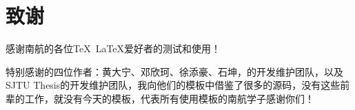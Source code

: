\chapter{致谢}

感谢南航的各位\TeX~\LaTeX 爱好者的测试和使用！

特别感谢\oldnuaathesis 的四位作者：黄大宁、邓欣珂、徐添豪、石坤，\seuthesix 的开发维护团队，以及SJTU Thesis的开发维护团队，我向他们的模板中借鉴了很多的源码，没有这些前辈的工作，就没有今天的\nuaathesis 模板，代表所有使用\nuaathesis 模板的南航学子感谢你们！
